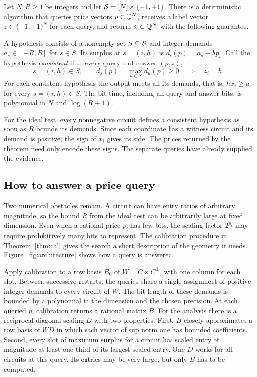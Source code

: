 \begin{theorem}\label{thm:prices}
Let \(N,R\ge1\) be integers and let \(\mathcal S=[N]\times\{-1,+1\}\).
There is a deterministic algorithm that queries price vectors
\(p\in\mathbb Q^N\), receives a label vector \(z\in\{-1,+1\}^N\) for each
query, and returns \(x\in\mathbb Q^N\) with the following guarantee.

A hypothesis consists of a nonempty set \(S\subseteq\mathcal S\) and
integer demands \(a_s\in[-R,R]\) for \(s\in S\). Its surplus at
\(s=(i,h)\) is \(d_s(p)=a_s-hp_i\). Call the hypothesis
\emph{consistent} if at every query and answer \((p,z)\),
\[
   s=(i,h)\in S,\qquad
   d_s(p)=\max_{u\in S}d_u(p)\ge0
   \quad\Longrightarrow\quad z_i=h.
\]
For each consistent hypothesis the output meets all its demands,
that is, \(h x_i\ge a_s\) for every \(s=(i,h)\in S\).
The bit time, including all query and answer bits, is polynomial in
\(N\) and \(\log(R+1)\).
\end{theorem}

For the ideal test, every nonnegative circuit defines a consistent
hypothesis as soon as \(R\) bounds its demands. Since each coordinate
has a witness circuit and its demand is positive, the sign of \(x_i\)
gives its side. The prices returned by the theorem need only encode
these signs. The separate queries have already supplied the evidence.

\subsection{How to answer a price query}

Two numerical obstacles remain. A circuit can have entry ratios of
arbitrary magnitude, so the bound \(R\) from the ideal test can be
arbitrarily large at fixed dimension. Even when a rational price
\(p_i\) has few bits, the scaling factor \(2^{p_i}\) may require
prohibitively many bits to represent. The calibration procedure in
Theorem~\ref{thm:cal} gives the search a short description of the
geometry it needs. Figure~\ref{fig:architecture} shows how a query is
answered.



Apply calibration to a row basis \(B_0\) of \(W=C\times C^\perp\),
with one column for each slot. Between successive restarts, the
queries share a single assignment of positive integer demands to
every circuit of \(W\). The bit length of these demands is bounded by
a polynomial in the dimension and the chosen precision. At each
queried \(p\), calibration returns a rational matrix \(B\). For
the analysis there is a reciprocal diagonal scaling \(D\) with two
properties. First, \(B\) closely approximates a row basis of \(WD\)
in which each vector of sup norm one has bounded coefficients.
Second, every slot of maximum surplus for a circuit has scaled
entry of magnitude at least one third of its largest scaled entry.
One \(D\) works for all circuits at this query. Its entries may be
very large, but only \(B\) has to be computed.

